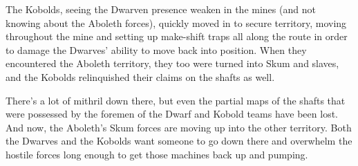 The Kobolds, seeing the Dwarven presence weaken in the mines (and not knowing about the Aboleth forces), quickly moved in to secure territory, moving throughout the mine and setting up make-shift traps all along the route in order to damage the Dwarves' ability to move back into position. When they encountered the Aboleth territory, they too were turned into Skum and slaves, and the Kobolds relinquished their claims on the shafts as well.

There's a lot of mithril down there, but even the partial maps of the shafts that were possessed by the foremen of the Dwarf and Kobold teams have been lost. And now, the Aboleth's Skum forces are moving up into the other territory. Both the Dwarves and the Kobolds want someone to go down there and overwhelm the hostile forces long enough to get those machines back up and pumping.
